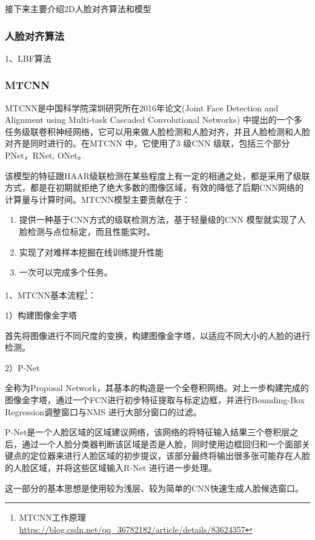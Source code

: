 接下来主要介绍2D人脸对齐算法和模型

\subsubsection{人脸对齐算法}

1、LBF算法

\subsubsection{MTCNN}

MTCNN是中国科学院深圳研究所在2016年论文(Joint Face Detection and Alignment using Multi-task Cascaded Convolutional Networks) 中提出的一个多任务级联卷积神经网络，它可以用来做人脸检测和人脸对齐，并且人脸检测和人脸对齐是同时进行的。在MTCNN 中，它使用了3 级CNN 级联，包括三个部分PNet，RNet, ONet。

该模型的特征跟HAAR级联检测在某些程度上有一定的相通之处，都是采用了级联方式，都是在初期就拒绝了绝大多数的图像区域，有效的降低了后期CNN网络的计算量与计算时间。MTCNN模型主要贡献在于：

\begin{enumerate}[label=\circled{\arabic*}]
    \item 提供一种基于CNN方式的级联检测方法，基于轻量级的CNN 模型就实现了人 脸检测与点位标定，而且性能实时。
    \item 实现了对难样本挖掘在线训练提升性能
    \item 一次可以完成多个任务。
\end{enumerate}


1、MTCNN基本流程\footnote{MTCNN工作原理 \url{https://blog.csdn.net/qq_36782182/article/details/83624357}}：

1）构建图像金字塔

首先将图像进行不同尺度的变换，构建图像金字塔，以适应不同大小的人脸的进行检测。

2）P-Net

全称为Proposal Network，其基本的构造是一个全卷积网络。对上一步构建完成的图像金字塔，通过一个FCN进行初步特征提取与标定边框，并进行Bounding-Box Regression调整窗口与NMS 进行大部分窗口的过滤。

P-Net是一个人脸区域的区域建议网络，该网络的将特征输入结果三个卷积层之后，通过一个人脸分类器判断该区域是否是人脸，同时使用边框回归和一个面部关键点的定位器来进行人脸区域的初步提议，该部分最终将输出很多张可能存在人脸的人脸区域，并将这些区域输入R-Net 进行进一步处理。

这一部分的基本思想是使用较为浅层、较为简单的CNN快速生成人脸候选窗口。

